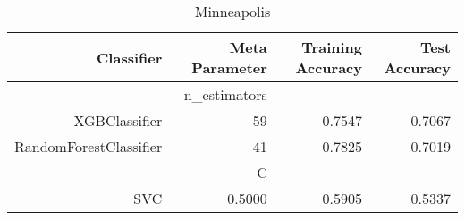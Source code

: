 
\begin{table}[H]
    \caption{Minneapolis}
    \centering
    \begin{tabular}{|r|r|r|r|}
        \hline
        Classifier &Meta Parameter &Training Accuracy
        &Test Accuracy\\
        \hline
        &n\_estimators &\multicolumn{2}{|r|}{}\\
        \hline
        XGBClassifier &59 &0.7547 &0.7067\\
        \hline
        RandomForestClassifier &41 &0.7825 &0.7019\\
        \hline
        &C &\multicolumn{2}{|r|}{}\\
        \hline
        SVC &0.5000 &0.5905 &0.5337\\
        \hline
    \end{tabular}
\end{table}
